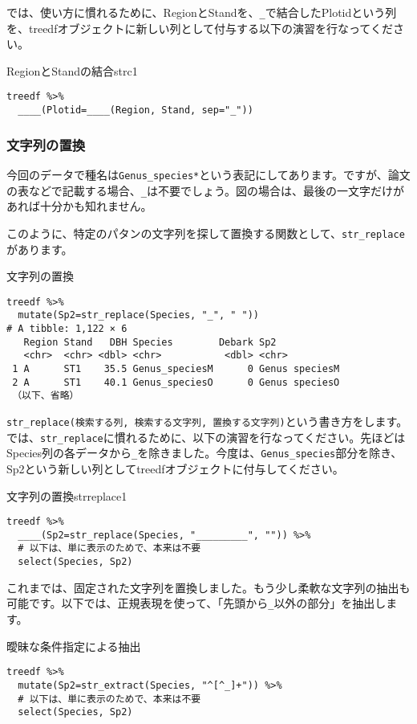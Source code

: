 では、使い方に慣れるために、RegionとStandを、\verb|_|で結合したPlotidという列を、treedfオブジェクトに新しい列として付与する以下の演習を行なってください。
\begin{exercise}{RegionとStandの結合}{strc1}
\begin{verbatim}
treedf %>%
  ____(Plotid=____(Region, Stand, sep="_"))
\end{verbatim}
\end{exercise}

    \subsubsection{文字列の置換}
今回のデータで種名は\verb|Genus_species*|という表記にしてあります。ですが、論文の表などで記載する場合、\verb|_|は不要でしょう。図の場合は、最後の一文字だけがあれば十分かも知れません。

このように、特定のパタンの文字列を探して置換する関数として、\verb|str_replace|があります。
\begin{itembox}[l]{文字列の置換}
\begin{verbatim}
treedf %>%
  mutate(Sp2=str_replace(Species, "_", " "))
# A tibble: 1,122 × 6
   Region Stand   DBH Species        Debark Sp2           
   <chr>  <chr> <dbl> <chr>           <dbl> <chr>         
 1 A      ST1    35.5 Genus_speciesM      0 Genus speciesM
 2 A      ST1    40.1 Genus_speciesO      0 Genus speciesO
 （以下、省略）
\end{verbatim}
\end{itembox}
\verb|str_replace(検索する列, 検索する文字列, 置換する文字列)|という書き方をします。では、\verb|str_replace|に慣れるために、以下の演習を行なってください。先ほどはSpecies列の各データから\verb|_|を除きました。今度は、\verb|Genus_species|部分を除き、Sp2という新しい列としてtreedfオブジェクトに付与してください。

\begin{exercise}{文字列の置換}{strreplace1}
\begin{verbatim}
treedf %>%
  ____(Sp2=str_replace(Species, "_________", "")) %>%
  # 以下は、単に表示のためで、本来は不要
  select(Species, Sp2)
\end{verbatim}
\end{exercise}

これまでは、固定された文字列を置換しました。もう少し柔軟な文字列の抽出も可能です。以下では、正規表現を使って、「先頭から\verb|_|以外の部分」を抽出します。
\begin{itembox}[l]{曖昧な条件指定による抽出}
\begin{verbatim}
treedf %>%
  mutate(Sp2=str_extract(Species, "^[^_]+")) %>%
  # 以下は、単に表示のためで、本来は不要
  select(Species, Sp2)
\end{verbatim}
\end{itembox}

